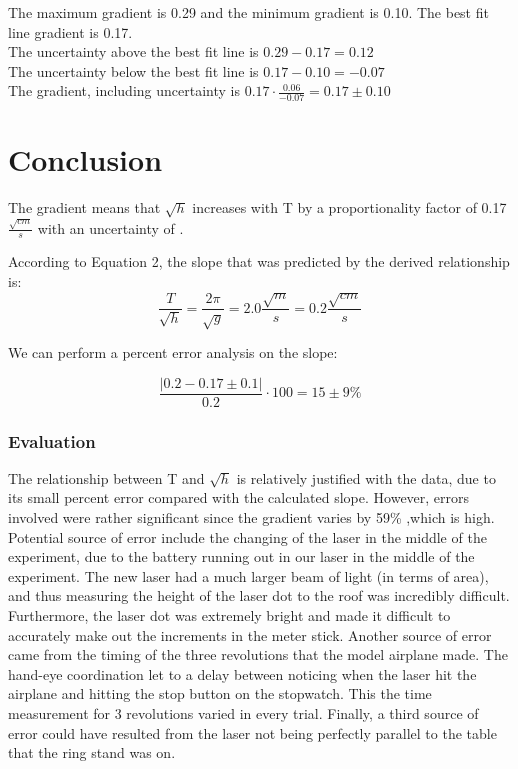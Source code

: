 \documentclass[10pt, letterpaper]{article}
\begin{document}
The maximum gradient is 0.29 and the minimum gradient is 0.10. The best fit line gradient is 0.17. \\
The uncertainty above the best fit line is $0.29 - 0.17 = 0.12$ \\
The uncertainty below the best fit line is $0.17 - 0.10 = -0.07$ \\
The gradient, including uncertainty is $0.17 \cdot \frac{0.06}{-0.07} = \boxed{0.17 \pm 0.10}$

\section{Conclusion}
The gradient means that $\sqrt{h}$ increases with T by a proportionality factor of 0.17 $\frac{\sqrt{cm}}{s}$
with an uncertainty of .

According to Equation 2, the slope that was predicted by the derived relationship is:
\[ \frac{T}{\sqrt{h}} = \frac{2\pi }{\sqrt{g}} = 2.0 \frac{\sqrt{m}}{s} = 0.2 \frac{\sqrt{cm}}{s} \]

We can perform a percent error analysis on the slope:

\[ \frac{|0.2 - 0.17 \pm 0.1|}{0.2} \cdot 100 = 15 \pm 9 \% \]

\subsubsection{Evaluation}
The relationship between T and $\sqrt{h}$ is relatively justified with the data, due to its small percent error compared with the calculated slope.
However, errors involved were rather significant since the gradient varies by 59\% ,which is high. Potential source of error include the changing of
the laser in the middle of the experiment, due to the battery running out in our laser in the middle of the experiment. The new laser had a much larger
beam of light (in terms of area), and thus measuring the height of the laser dot to the roof was incredibly difficult. Furthermore, the laser dot was
extremely bright and made it difficult to accurately make out the increments in the meter stick. Another source of error came from the timing of the
three revolutions that the model airplane made. The hand-eye coordination let to a delay between noticing when the laser hit the airplane and hitting
the stop button on the stopwatch. This the time measurement for 3 revolutions varied in every trial. Finally, a third source of error could have resulted
from the laser not being perfectly parallel to the table that the ring stand was on.
\end{document}
